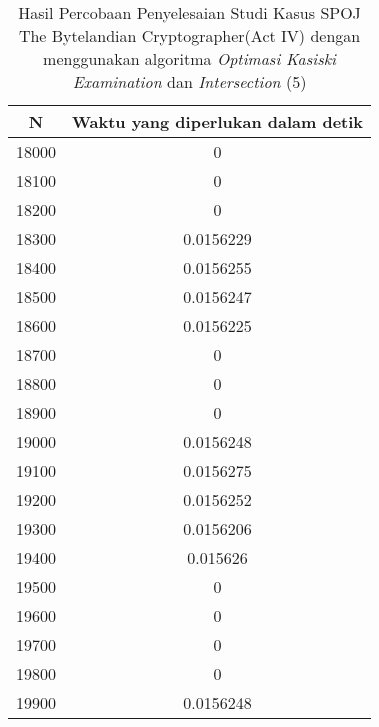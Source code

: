 \begin{table}[H]
\centering
\begin{tabular}{|c|c|}\hline
N&Waktu yang diperlukan dalam detik\\ \hline
18000&0\\ \hline
18100&0\\ \hline
18200&0\\ \hline
18300&0.0156229\\ \hline
18400&0.0156255\\ \hline
18500&0.0156247\\ \hline
18600&0.0156225\\ \hline
18700&0\\ \hline
18800&0\\ \hline
18900&0\\ \hline
19000&0.0156248\\ \hline
19100&0.0156275\\ \hline
19200&0.0156252\\ \hline
19300&0.0156206\\ \hline
19400&0.015626\\ \hline
19500&0\\ \hline
19600&0\\ \hline
19700&0\\ \hline
19800&0\\ \hline
19900&0.0156248\\ \hline
\end{tabular}
\caption {Hasil Percobaan Penyelesaian Studi Kasus SPOJ The Bytelandian Cryptographer(Act IV) dengan menggunakan algoritma \textit{Optimasi Kasiski Examination} dan \textit{Intersection} (5)}
\label{tab1:res10}
\end{table}
